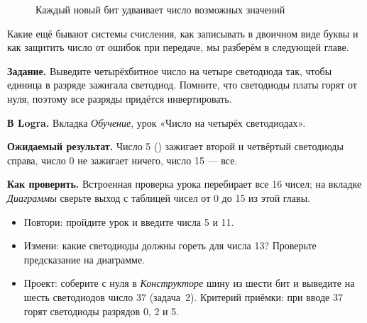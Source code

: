 \begin{figure}[H]
\centering
{}
\caption{Каждый новый бит удваивает число возможных значений}
\end{figure}

Какие ещё бывают системы счисления, как записывать в двоичном виде буквы и
как защитить число от ошибок при передаче, мы разберём в следующей главе.

\begin{diybox}
\textbf{Задание.} Выведите четырёхбитное число на четыре светодиода так,
чтобы единица в разряде зажигала светодиод. Помните, что светодиоды платы
горят от нуля, поэтому все разряды придётся инвертировать.\par
\textbf{В Logra.} Вкладка \emph{Обучение}, урок «Число на четырёх
светодиодах».\par
\textbf{Ожидаемый результат.} Число 5 () зажигает второй и
четвёртый светодиоды справа, число 0 не зажигает ничего, число 15 ---
все.\par
\textbf{Как проверить.} Встроенная проверка урока перебирает все 16
чисел; на вкладке \emph{Диаграммы} сверьте выход с таблицей чисел
от 0 до 15 из этой главы.
\begin{itemize}[leftmargin=3.4em,labelwidth=3em,labelsep=0.4em,align=left]
  \item[\stars{1}] Повтори: пройдите урок и введите числа 5 и 11.
  \item[\stars{2}] Измени: какие светодиоды должны гореть для числа 13? Проверьте
    предсказание на диаграмме.
  \item[\stars{3}] Проект: соберите с нуля в \emph{Конструкторе} шину из шести
    бит и выведите на шесть светодиодов число 37 (задача~2). Критерий
    приёмки: при вводе 37 горят светодиоды разрядов 0, 2 и 5.
\end{itemize}
\end{diybox}

